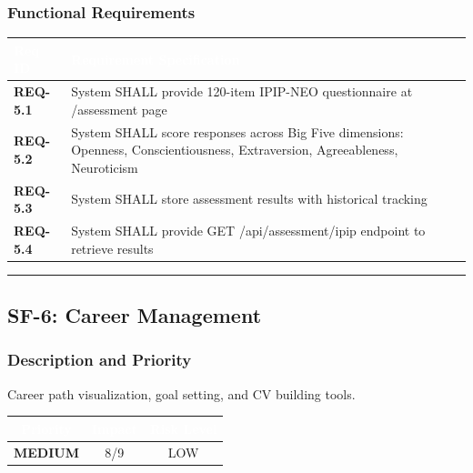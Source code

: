 \documentclass[12pt,a4paper]{article}
\begin{document}
\subsubsection{Functional Requirements}

\vspace{0.3em}
\begin{center}
\begin{tabular}{|l|p{11cm}|}
\hline
\rowcolor{deepblue}
\textcolor{white}{\textbf{Req ID}} & \textcolor{white}{\textbf{Requirement Specification}} \\
\hline
\rowcolor{lightgray}
\textbf{REQ-5.1} & System SHALL provide 120-item IPIP-NEO questionnaire at /assessment page \\
\hline
\textbf{REQ-5.2} & System SHALL score responses across Big Five dimensions: Openness, Conscientiousness, Extraversion, Agreeableness, Neuroticism \\
\hline
\rowcolor{lightgray}
\textbf{REQ-5.3} & System SHALL store assessment results with historical tracking \\
\hline
\textbf{REQ-5.4} & System SHALL provide GET /api/assessment/ipip endpoint to retrieve results \\
\hline
\end{tabular}
\end{center}

\vspace{1em}
\hrule

\subsection{SF-6: Career Management}

\subsubsection{Description and Priority}
Career path visualization, goal setting, and CV building tools.

\vspace{0.3em}
\begin{center}
\begin{tabular}{|c|c|c|}
\hline
\rowcolor{accentblue}
\textcolor{white}{\textbf{Priority}} & \textcolor{white}{\textbf{Impact}} & \textcolor{white}{\textbf{Risk Level}} \\
\hline
\rowcolor{lightgray}
\textbf{\textcolor{accentblue}{MEDIUM}} & 8/9 & LOW \\
\hline
\end{tabular}
\end{center}
\end{document}

